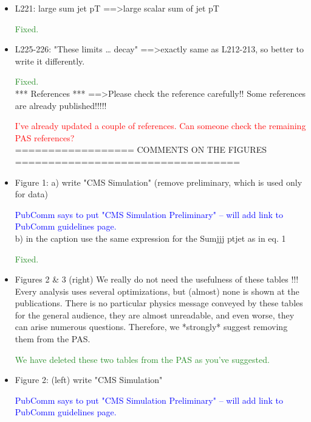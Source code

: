\documentclass[paper=a4, fontsize=11pt]{scrartcl}
\begin{document}
\begin{itemize}
\item L221: 
large sum jet pT ==\textgreater large scalar sum of jet pT 

\textcolor{ForestGreen}{Fixed.}\\

\item L225-226: 
"These limits … decay" ==\textgreater exactly same as L212-213, so better to write it 
differently. 

\textcolor{ForestGreen}{Fixed.}\\


*** References *** 
==\textgreater Please check the reference carefully!! Some references are already 
published!!!!! 

\textcolor{Red}{I've already updated a couple of references. Can someone check the remaining PAS references?}\\


================== COMMENTS ON THE FIGURES ================================== 


\item Figure 1: 
a) write "CMS Simulation" (remove preliminary, which is used only for data) 

\textcolor{Blue}{PubComm says to put "CMS Simulation Preliminary" -- will add link to PubComm guidelines page.}\\

b) in the caption use the same expression for the Sumjjj ptjet as in eq. 1 

\textcolor{ForestGreen}{Fixed.}\\

\item Figures 2 \& 3 (right) 
We really do not need the usefulness of these tables !!! Every analysis uses 
several optimizations, but (almost) none is shown at the publications. There 
is no particular physics message conveyed by these tables for the general 
audience, they are almost unreadable, and even worse, they can arise numerous 
questions. Therefore, we *strongly* suggest removing them from the PAS. 

\textcolor{ForestGreen}{We have deleted these two tables from the PAS as you've suggested.}\\


\item Figure 2: 
(left) write "CMS Simulation" 

\textcolor{Blue}{PubComm says to put "CMS Simulation Preliminary" -- will add link to PubComm guidelines page.}\\


\end{itemize}
\end{document}
